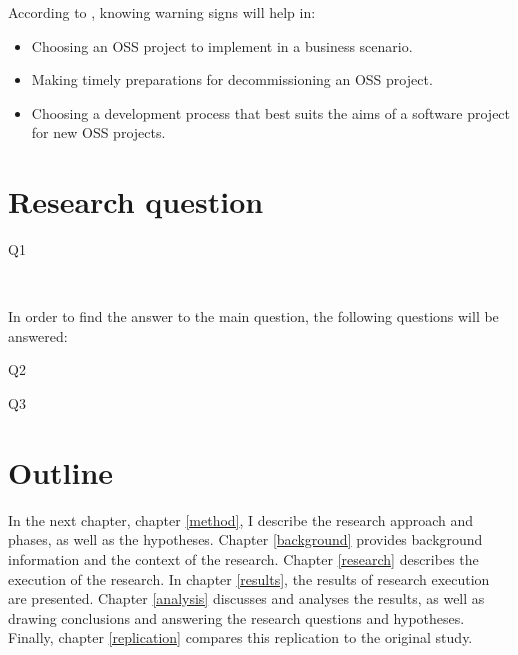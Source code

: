 \noindent
According to \citet{karus2013}, knowing warning signs will help in:
\begin{itemize}
	\item Choosing an OSS project to implement in a business scenario.
	\item Making timely preparations for decommissioning an OSS project.
	\item Choosing a development process that best suits the aims of a software
	project for new OSS projects.
\end{itemize}




\section{Research question}
\label{questions}

\begin{description}
	\item[Q1\label{itm:question_warningsigns}]
	\textit{\researchQuestion}\\[0.3cm]
\end{description}

\noindent
In order to find the answer to the main question, the following
questions will be answered:
\begin{description}
	\item[Q2\label{itm:question_patterns}] \textit{\subQuestionOne}
	\item[Q3\label{itm:question_successfailure}] \textit{\subQuestionTwo}
\end{description}


\section{Outline}

In the next chapter, chapter \ref{method}, I describe the research approach and
phases, as well as the hypotheses. Chapter \ref{background} provides background
information and the context of the research. Chapter \ref{research} describes
the execution of the research. In chapter \ref{results}, the results of research
execution are presented. Chapter \ref{analysis} discusses and analyses the
results, as well as drawing conclusions and answering the research questions
and hypotheses.
Finally, chapter \ref{replication} compares this replication to the original
study.


